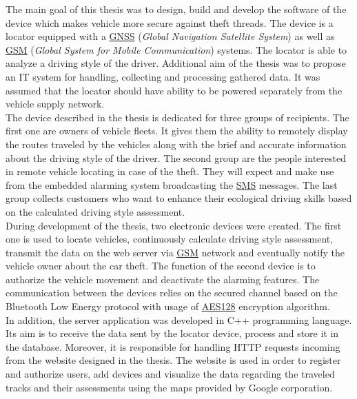 \begin{singlespacing}


The main goal of this thesis was to design, build and develop the software of the device which makes vehicle more secure against theft threads. The device is a locator equipped with a \underline{GNSS} (\textit{Global Navigation Satellite System}) as well as \underline{GSM} (\textit{Global System for Mobile Communication}) systems. The locator is able to analyze a driving style of the driver. Additional  aim of the thesis was to propose an IT system for handling, collecting and processing gathered data. It was assumed that the locator should have ability to be powered separately from the vehicle supply network. \\

The device described in the thesis is dedicated for three groups of recipients. The first one are owners of vehicle fleets. It gives them the ability to remotely display the routes traveled by the vehicles along with the brief and accurate information about the driving style of the driver. The second group are the people interested in remote vehicle locating in case of the theft. They will expect and make use from the embedded alarming system broadcasting the \underline{SMS} messages. The last group collects customers who want to enhance their ecological driving skills based on the calculated driving style assessment. \\

During development of the thesis, two electronic devices were created. The first one is used to locate vehicles,  continuously calculate driving style assessment, transmit the data on the web server via \underline{GSM} network and eventually notify the vehicle owner about the car theft. The function of the second device is to authorize the vehicle movement and deactivate the alarming features. The communication between the devices relies on the secured channel based on the Bluetooth Low Energy protocol with usage of \underline{AES128} encryption algorithm. \\

In addition, the server application was developed in C++ programming language. Its aim is to receive the data sent by the locator device, process and store it in the database. Moreover, it is responsible for handling HTTP requests incoming from the website designed in the thesis. The website is used in order to register and authorize users, add devices and visualize the data regarding the traveled tracks and their assessments using the maps provided by Google corporation. \\


\end{singlespacing}
